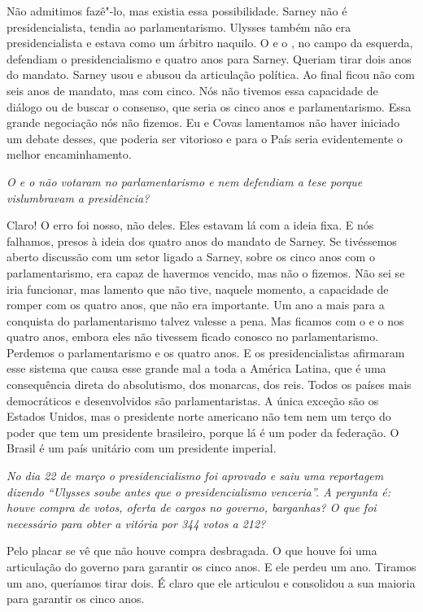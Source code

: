Não admitimos fazê"-lo, mas existia essa possibilidade.
Sarney não é presidencialista, tendia ao parlamentarismo. Ulysses também
não era presidencialista e estava como um árbitro naquilo. O  e o ,
no campo da esquerda, defendiam o presidencialismo e quatro anos para
Sarney. Queriam tirar dois anos do mandato. Sarney usou e abusou da
articulação política. Ao final ficou não com seis anos de mandato, mas
com cinco. Nós não tivemos essa capacidade de diálogo ou de buscar o
consenso, que seria os cinco anos e parlamentarismo. Essa grande
negociação nós não fizemos. Eu e Covas lamentamos não haver iniciado um
debate desses, que poderia ser vitorioso e para o País seria
evidentemente o melhor encaminhamento.

\medskip

\noindent\emph{O  e o  não votaram no parlamentarismo e nem defendiam a
tese porque vislumbravam a presidência?}

Claro! O erro foi nosso, não deles. Eles estavam lá com
a ideia fixa. E nós falhamos, presos à ideia dos quatro anos do mandato
de Sarney. Se tivéssemos aberto discussão com um setor ligado a Sarney,
sobre os cinco anos com o parlamentarismo, era capaz de havermos
vencido, mas não o fizemos. Não sei se iria funcionar, mas lamento que
não tive, naquele momento, a capacidade de romper com os quatro anos,
que não era importante. Um ano a mais para a conquista do
parlamentarismo talvez valesse a pena. Mas ficamos com o  e o  nos
quatro anos, embora eles não tivessem ficado conosco no parlamentarismo.
Perdemos o parlamentarismo e os quatro anos. E os presidencialistas
afirmaram esse sistema que causa esse grande mal a toda a América
Latina, que é uma consequência direta do absolutismo, dos monarcas, dos
reis. Todos os países mais democráticos e desenvolvidos são
parlamentaristas. A única exceção são os Estados Unidos, mas o
presidente norte americano não tem nem um terço do poder que tem um
presidente brasileiro, porque lá é um poder da federação. O Brasil é um
país unitário com um presidente imperial.

\medskip

\noindent\emph{No dia 22 de março o presidencialismo foi aprovado e saiu uma
reportagem dizendo ``Ulysses soube antes que o presidencialismo
venceria''. A pergunta é: houve compra de votos, oferta de cargos no
governo, barganhas? O que foi necessário para obter a vitória por 344
votos a 212?}

Pelo placar se vê que não houve compra desbragada. O
que houve foi uma articulação do governo para garantir os cinco anos. E
ele perdeu um ano. Tiramos um ano, queríamos tirar dois. É claro que ele
articulou e consolidou a sua maioria para garantir os cinco anos.

